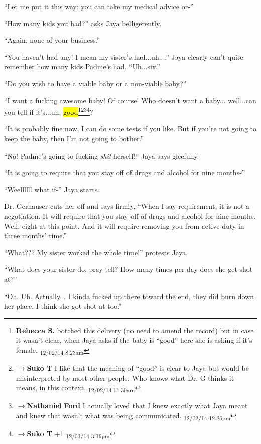 ``Let me put it this way: you can take my medical advice or-''

``How many kids you had?'' asks Jaya belligerently.

``Again, none of your business.''

``You haven't had any!  I mean my sister's had...uh....'' Jaya clearly can't quite remember how many kids Padme's had.  ``Uh...six.''

``Do you wish to have a viable baby or a non-viable baby?''

``I want a fucking awesome baby!  Of course!  Who doesn't want a baby... well...can you tell if it's...uh, \hl{good}\footnote{\textbf{Rebecca S. }botched this delivery (no need to amend the record) but in case it wasn't clear, when Jaya asks if the baby is ``good'' here she is asking if it's female. \textsubscript{12/02/14 8:23am}}\footnote{$\rightarrow$\textbf{Suko T }I like that the meaning of ``good'' is clear to Jaya but would be misinterpreted by most other people.  Who knows what Dr. G thinks it means, in this context. \textsubscript{12/02/14 11:30am}}\footnote{$\rightarrow$\textbf{Nathaniel Ford }I actually loved that I knew exactly what Jaya meant and knew that wasn't what was being communicated. \textsubscript{12/02/14 12:26pm}}\footnote{$\rightarrow$\textbf{Suko T }+1 \textsubscript{12/03/14 3:19pm}}?

``It is probably fine now, I can do some tests if you like.  But if you're not going to keep the baby, then I'm not going to bother.''

``No!  Padme's going to fucking \textit{shit }herself!'' Jaya says gleefully.

``It is going to require that you stay off of drugs and alcohol for nine months-''

``Weellllll what if-'' Jaya starts.

Dr. Gerhauser cuts her off and says firmly, ``When I say requirement, it is not a negotiation.  It will require that you stay off of drugs and alcohol for nine months.  Well, eight at this point.  And it will require removing you from active duty in three months' time.''

``What???  My sister worked the whole time!'' protests Jaya.

``What does your sister do, pray tell?  How many times per day does she get shot at?''

``Oh. Uh.  Actually... I kinda fucked up there toward the end, they did burn down her place.  I think she got shot at too.''

